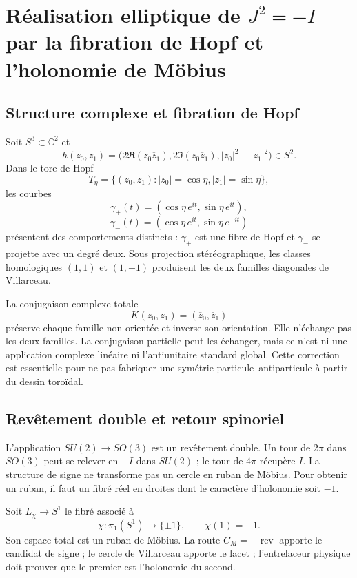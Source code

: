 \section{Réalisation elliptique de \(J^2=-I\) par la fibration de Hopf et l’holonomie de Möbius}

\subsection{Structure complexe et fibration de Hopf}

Soit \(S^3\subset\mathbb C^2\) et
\[
h(z_0,z_1)=
\bigl(2\Re(z_0\overline z_1),
2\Im(z_0\overline z_1),|z_0|^2-|z_1|^2\bigr)
\in S^2.
\]
Dans le tore de Hopf
\[
T_\eta=\{(z_0,z_1):|z_0|=\cos\eta,
|z_1|=\sin\eta\},
\]
les courbes
\[
\gamma_+(t)=(\cos\eta\,e^{it},\sin\eta\,e^{it}),
\]
\[
\gamma_-(t)=(\cos\eta\,e^{it},\sin\eta\,e^{-it})
\]
présentent des comportements distincts : \(\gamma_+\) est une fibre de Hopf et
\(\gamma_-\) se projette avec un degré deux. Sous projection stéréographique, les
classes homologiques \((1,1)\) et \((1,-1)\) produisent les deux familles diagonales
de Villarceau.

La conjugaison complexe totale
\[
K(z_0,z_1)=(\overline z_0,\overline z_1)
\]
préserve chaque famille non orientée et inverse son orientation. Elle n’échange pas
les deux familles. La conjugaison partielle peut les échanger, mais ce n’est ni une
application complexe linéaire ni l’antiunitaire standard global. Cette correction
est essentielle pour ne pas fabriquer une symétrie particule--antiparticule à partir du
dessin toroïdal.

\subsection{Revêtement double et retour spinoriel}

L’application \(SU(2)\to SO(3)\) est un revêtement double. Un tour de
\(2\pi\) dans \(SO(3)\) peut se relever en \(-I\) dans \(SU(2)\) ; le tour de
\(4\pi\) récupère \(I\). La structure de signe ne transforme pas un cercle en
ruban de Möbius. Pour obtenir un ruban, il faut un fibré réel en droites
dont le caractère d’holonomie soit \(-1\).

Soit \(L_\chi\to S^1\) le fibré associé à
\[
\chi:\pi_1(S^1)\longrightarrow\{\pm1\},
\qquad \chi(1)=-1.
\]
Son espace total est un ruban de Möbius. La route \(C_M=-\operatorname{rev}\)
apporte le candidat de signe ; le cercle de Villarceau apporte le lacet ;
l’entrelaceur physique doit prouver que le premier est l’holonomie du second.

